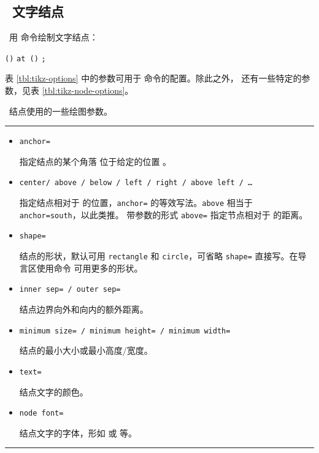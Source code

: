 \subsection{\TikZ\ 文字结点}\label{subsec:tikz-node}

\TikZ\ 用  命令绘制文字结点：
\begin{command}
 \texttt{()} \texttt{at ()} \texttt{;}
\end{command}
\begin{example}
\end{example}

表 \ref{tbl:tikz-options} 中的参数可用于  命令的配置。除此之外， 还有一些特定的参数，见表 \ref{tbl:tikz-node-options}。

\begin{table}[htp]
\caption{\TikZ\ 结点使用的一些绘图参数。}\label{tbl:tikz-node-options}
\small
\hrule
\begin{itemize}
  \item \texttt{anchor=} \par
  指定结点的某个角落  位于给定的位置 。
  \item \texttt{center/ above / below / left / right / above left / \ldots} \par
  指定结点相对于  的位置，\texttt{anchor=} 的等效写法。\texttt{above} 相当于 \texttt{anchor=south}，以此类推。
  带参数的形式 \texttt{above=} 指定节点相对于  的距离。
  \item \texttt{shape=} \par
  结点的形状，默认可用 \texttt{rectangle} 和 \texttt{circle}，可省略 \texttt{shape=} 直接写。在导言区使用命令 
   可用更多的形状。
  \item \texttt{inner sep= / outer sep=} \par
  结点边界向外和向内的额外距离。
  \item \texttt{minimum size= / minimum height= / minimum width=} \par
  结点的最小大小或最小高度/宽度。
  \item \texttt{text=} \par
  结点文字的颜色。
  \item \texttt{node font=} \par
  结点文字的字体，形如  或  等。
\end{itemize}
\hrule
\end{table}

